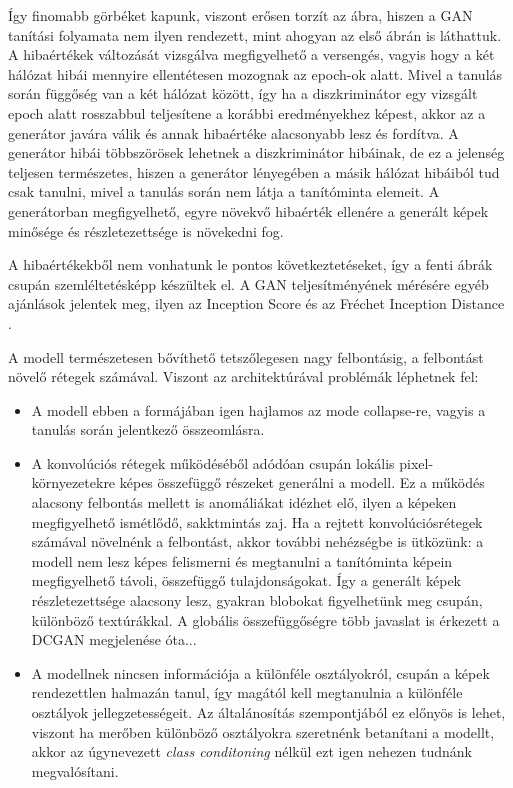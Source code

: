 Így finomabb görbéket kapunk, viszont erősen torzít az ábra, hiszen a GAN tanítási folyamata nem ilyen rendezett, mint ahogyan az első ábrán is láthattuk.
A hibaértékek változását vizsgálva megfigyelhető a versengés, vagyis hogy a két hálózat hibái mennyire ellentétesen mozognak az epoch-ok alatt. Mivel a tanulás során függőség van a két hálózat között, így ha a diszkriminátor egy vizsgált epoch alatt rosszabbul teljesítene a korábbi eredményekhez képest, akkor az a generátor javára válik és annak hibaértéke alacsonyabb lesz és fordítva. A generátor hibái többszörösek lehetnek a diszkriminátor hibáinak, de ez a jelenség teljesen természetes, hiszen a generátor lényegében a másik hálózat hibáiból tud csak tanulni, mivel a tanulás során nem látja a tanítóminta elemeit. A generátorban megfigyelhető, egyre növekvő hibaérték ellenére a generált képek minősége és részletezettsége is növekedni fog.

A hibaértékekből nem vonhatunk le pontos következtetéseket, így a fenti ábrák csupán szemléltetésképp készültek el. A GAN teljesítményének mérésére egyéb ajánlások jelentek meg, ilyen az Inception Score \cite{salimans2016improved} és az Fréchet Inception Distance \cite{heusel2017gans}.


A modell természetesen bővíthető tetszőlegesen nagy felbontásig, a felbontást növelő rétegek számával. Viszont az architektúrával problémák léphetnek fel:
\begin{itemize}
	\item A modell ebben a formájában igen hajlamos az mode collapse-re, vagyis a tanulás során jelentkező összeomlásra.
	\item A konvolúciós rétegek működéséből adódóan csupán lokális pixel-környezetekre képes összefüggő részeket generálni a modell.
	Ez a működés alacsony felbontás mellett is anomáliákat idézhet elő, ilyen a képeken megfigyelhető ismétlődő, sakktmintás zaj. Ha a rejtett konvolúciósrétegek számával növelnénk a felbontást, akkor további nehézségbe is ütközünk: a modell nem lesz képes felismerni és megtanulni a tanítóminta képein megfigyelhető távoli, összefüggő tulajdonságokat. Így a generált képek részletezettsége alacsony lesz, gyakran blobokat figyelhetünk meg csupán, különböző textúrákkal. A globális összefüggőségre több javaslat is érkezett a DCGAN megjelenése óta...
	\item A modellnek nincsen információja a különféle osztályokról, csupán a képek rendezettlen halmazán tanul, így magától kell megtanulnia a különféle osztályok jellegzetességeit.
	Az általánosítás szempontjából ez előnyös is lehet, viszont ha merőben különböző osztályokra szeretnénk betanítani a modellt, akkor az úgynevezett \textit{class conditoning} nélkül ezt igen nehezen tudnánk megvalósítani.
\end{itemize}

